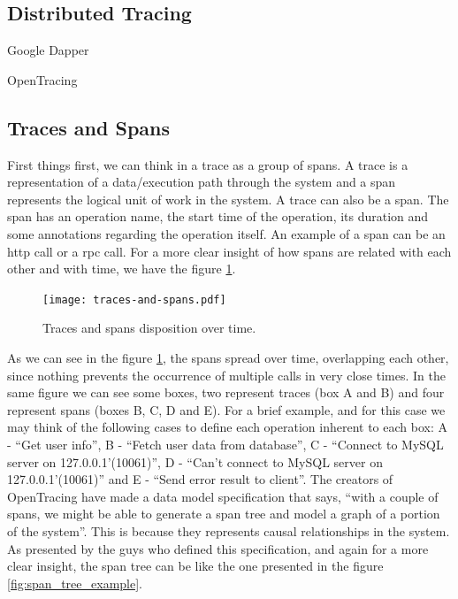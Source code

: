 \subsection{Distributed Tracing}
\label{subsec:distributed_tracing}



Google Dapper~\cite{Sigelman2010} 

OpenTracing~


\subsection{Traces and Spans}
\label{subsec:traces_and_spans}

First things first, we can think in a trace as a group of spans. A trace is a representation of a data/execution path through the system and a span represents the logical unit of work in the system. A trace can also be a span. The span has an operation name, the start time of the operation, its duration and some annotations regarding the operation itself. An example of a span can be an \gls{http} call or a \gls{rpc} call. For a more clear insight of how spans are related with each other and with time, we have the figure \ref{fig:traces_and_spans_disposition_over_time}.

\begin{figure}[H]
    \centering
    \texttt{[image: traces-and-spans.pdf]}
    \caption{Traces and spans disposition over time.}
    \label{fig:traces_and_spans_disposition_over_time}
\end{figure}

As we can see in the figure \ref{fig:traces_and_spans_disposition_over_time}, the spans spread over time, overlapping each other, since nothing prevents the occurrence of multiple calls in very close times. In the same figure we can see some boxes, two represent traces (box A and B) and four represent spans (boxes B, C, D and E). For a brief example, and for this case we may think of the following cases to define each operation inherent to each box: A - ``Get user info'', B - ``Fetch user data from database'', C - ``Connect to MySQL server on 127.0.0.1'(10061)'', D - ``Can't connect to MySQL server on 127.0.0.1'(10061)'' and E - ``Send error result to client''. The creators of OpenTracing have made a data model specification that says, ``with a couple of spans, we might be able to generate a span tree and model a graph of a portion of the system''\cite{open_tracing_data_model_specification}. This is because they represents causal relationships in the system. As presented by the guys who defined this specification, and again for a more clear insight, the span tree can be like the one presented in the figure \ref{fig:span_tree_example}.

